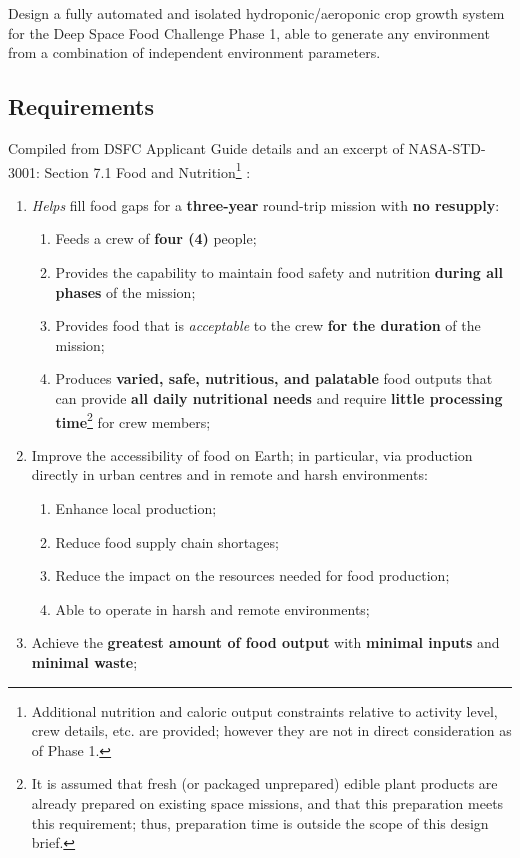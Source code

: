 \documentclass{report}
\begin{document}
Design a fully automated and isolated hydroponic/aeroponic crop growth system for the 
Deep Space Food Challenge Phase 1\cite{dsfc}, able to generate any environment from a 
combination of independent environment parameters.

\subsection{Requirements}
\label{sec:requirements}

Compiled from DSFC Applicant Guide details \cite{applicantguide} and an excerpt of NASA-STD-3001: Section 7.1 Food and Nutrition\footnote{Additional nutrition and caloric output constraints relative to activity level, crew details, etc. are provided; however they are not in direct consideration as of Phase 1.} \cite{nutrition}:
\begin{enumerate}
    \item \textit{Helps} fill food gaps for a \textbf{three-year} round-trip mission with 
    \textbf{no resupply}:
    \begin{enumerate}
        \item Feeds a crew of \textbf{four (4)} people;
        \item Provides the capability to maintain food safety and nutrition \textbf{during all phases} of the mission;
        \item Provides food that is \textit{acceptable} to the crew \textbf{for the duration} of the mission;
        \item Produces \textbf{varied, safe, nutritious, and palatable} food outputs that 
        can provide \textbf{all 
        daily nutritional needs} and require \textbf{little processing time}\footnote{It is 
        assumed that fresh (or packaged unprepared) edible plant products are already 
        prepared on existing space missions, and that this preparation meets this requirement; 
        thus, preparation time is outside the scope of this design brief.} for crew members;
    \end{enumerate}
    \item Improve the accessibility of food on Earth; in particular, via production 
    directly in urban centres and in remote and harsh environments:
    \begin{enumerate}
        \item Enhance local production;
        \item Reduce food supply chain shortages;
        \item Reduce the impact on the resources needed for food production;
        \item Able to operate in harsh and remote environments;
    \end{enumerate}
    \item Achieve the \textbf{greatest amount of food output} with \textbf{minimal inputs} and \textbf{minimal waste};
\end{enumerate}
\end{document}
